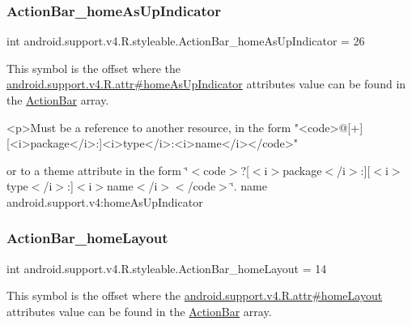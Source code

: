 \subsubsection{\texorpdfstring{Action\+Bar\+\_\+home\+As\+Up\+Indicator}{ActionBar\_homeAsUpIndicator}}
{\footnotesize\ttfamily int android.\+support.\+v4.\+R.\+styleable.\+Action\+Bar\+\_\+home\+As\+Up\+Indicator = 26\hspace{0.3cm}{\ttfamily [static]}}

This symbol is the offset where the \hyperlink{classandroid_1_1support_1_1v4_1_1R_1_1attr_a97ae31144cbfcae435daedba111ed06d}{android.\+support.\+v4.\+R.\+attr\#home\+As\+Up\+Indicator} attribute\textquotesingle{}s value can be found in the \hyperlink{classandroid_1_1support_1_1v4_1_1R_1_1styleable_adc5a3492b9c46265760d7120a04d6afa}{Action\+Bar} array.

\begin{DoxyVerb}      <p>Must be a reference to another resource, in the form "<code>@[+][<i>package</i>:]<i>type</i>:<i>name</i></code>"
\end{DoxyVerb}
 or to a theme attribute in the form \char`\"{}$<$code$>$?\mbox{[}$<$i$>$package$<$/i$>$\+:\mbox{]}\mbox{[}$<$i$>$type$<$/i$>$\+:\mbox{]}$<$i$>$name$<$/i$>$$<$/code$>$\char`\"{}.  name android.\+support.\+v4\+:home\+As\+Up\+Indicator \mbox{\label{classandroid_1_1support_1_1v4_1_1R_1_1styleable_abb8398bbec7921fb6596d6de854eb0cc}} 
\subsubsection{\texorpdfstring{Action\+Bar\+\_\+home\+Layout}{ActionBar\_homeLayout}}
{\footnotesize\ttfamily int android.\+support.\+v4.\+R.\+styleable.\+Action\+Bar\+\_\+home\+Layout = 14\hspace{0.3cm}{\ttfamily [static]}}

This symbol is the offset where the \hyperlink{classandroid_1_1support_1_1v4_1_1R_1_1attr_aea252ac5ec97a6ebd1e1f4b2ab6d36b2}{android.\+support.\+v4.\+R.\+attr\#home\+Layout} attribute\textquotesingle{}s value can be found in the \hyperlink{classandroid_1_1support_1_1v4_1_1R_1_1styleable_adc5a3492b9c46265760d7120a04d6afa}{Action\+Bar} array.

